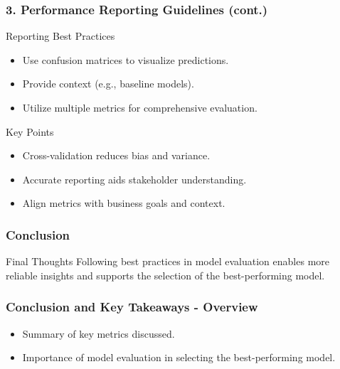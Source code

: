 \documentclass{beamer}
\begin{document}
\begin{frame}[fragile]
    \frametitle{3. Performance Reporting Guidelines (cont.)}
    \begin{block}{Reporting Best Practices}
        \begin{itemize}
            \item Use confusion matrices to visualize predictions.
            \item Provide context (e.g., baseline models).
            \item Utilize multiple metrics for comprehensive evaluation.
        \end{itemize}
    \end{block}
    
    \begin{block}{Key Points}
        \begin{itemize}
            \item Cross-validation reduces bias and variance.
            \item Accurate reporting aids stakeholder understanding.
            \item Align metrics with business goals and context.
        \end{itemize}
    \end{block}
\end{frame}

\begin{frame}[fragile]
    \frametitle{Conclusion}
    \begin{block}{Final Thoughts}
        Following best practices in model evaluation enables more reliable insights and supports the selection of the best-performing model.
    \end{block}
\end{frame}

\begin{frame}[fragile]
    \frametitle{Conclusion and Key Takeaways - Overview}
    \begin{itemize}
        \item Summary of key metrics discussed.
        \item Importance of model evaluation in selecting the best-performing model.
    \end{itemize}
\end{frame}
\end{document}
